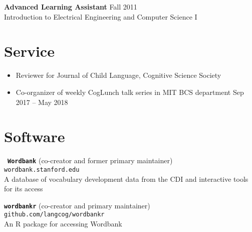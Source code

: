 \documentclass[11pt,]{article}
\providecommand{\tightlist}{%
  \setlength{\itemsep}{0pt}\setlength{\parskip}{0pt}}
\begin{document}
\textbf{Advanced Learning Assistant} \hfill Fall 2011\\
\hspace*{0.333em}\hspace*{0.333em}\hspace*{0.333em}\hspace*{0.333em}Introduction
to Electrical Engineering and Computer Science I

\hypertarget{service}{%
\section{Service}\label{service}}

\begin{itemize}
\tightlist
\item
  Reviewer for Journal of Child Language, Cognitive Science Society
\item
  Co-organizer of weekly CogLunch talk series in MIT BCS department
  \hfill Sep 2017 -- May 2018
\end{itemize}

\hypertarget{software}{%
\section{Software}\label{software}}

~\textbf{\texttt{Wordbank}} (co-creator and former primary maintainer)\\
\hspace*{0.333em}\hspace*{0.333em}\hspace*{0.333em}\hspace*{0.333em}\texttt{wordbank.stanford.edu}\\
\hspace*{0.333em}\hspace*{0.333em}\hspace*{0.333em}\hspace*{0.333em}A
database of vocabulary development data from the CDI and interactive
tools for its access

\textbf{\texttt{wordbankr}} (co-creator and primary maintainer)\\
\hspace*{0.333em}\hspace*{0.333em}\hspace*{0.333em}\hspace*{0.333em}\texttt{github.com/langcog/wordbankr}\\
\hspace*{0.333em}\hspace*{0.333em}\hspace*{0.333em}\hspace*{0.333em}An R
package for accessing Wordbank
\end{document}
